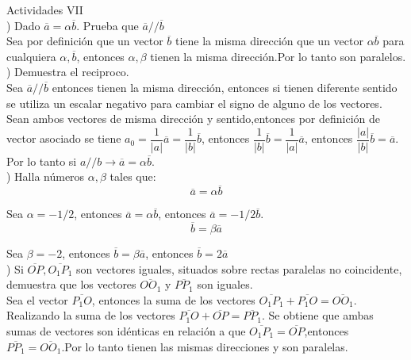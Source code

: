 \documentclass[11pt,a4paper]{article}
\begin{document}
\begin{justify}
\noindent
Actividades VII\\

) Dado $\overline{a} = \alpha \overline{b}$. Prueba que $\overline{a} // \overline{b}$\\

\noindent
Sea por definición que un vector $\overline{b}$ tiene la misma dirección que un vector $\alpha \overline{b}$ para cualquiera $\alpha ,\overline{b}$, entonces $\alpha, \beta$ tienen la misma dirección.Por lo tanto son paralelos.\\

) Demuestra el reciproco.\\

\noindent
Sea $\overline{a} // \overline{b}$ entonces tienen la misma dirección, entonces si tienen diferente sentido se utiliza un escalar negativo para cambiar el signo de alguno de los vectores.\\

\noindent
Sean ambos vectores de misma dirección y sentido,entonces por definición de vector asociado se tiene $a_0=\dfrac{1}{|a|}\overline{a} = \dfrac{1}{|b|}\overline{b}$, entonces $\dfrac{1}{|b|}\overline{b} = \dfrac{1}{|a|}\overline{a}$, entonces  $\dfrac{|a|}{|b|}\overline{b} = \overline{a}$. Por lo tanto si $a // b \rightarrow \overline{a} = \alpha \overline{b}$.\\

) Halla números $\alpha, \beta $ tales que:\\

$$ \overline{a} = \alpha \overline{b} $$

\noindent
Sea $\alpha = -1/2$, entonces $\overline{a} = \alpha \overline{b}$, entonces $\overline{a} = -1/2 \overline{b}$.\\

$$ \overline{b} = \beta \overline{a} $$

Sea $\beta = -2$, entonces $\overline{b} = \beta \overline{a}$, entonces $ \overline{b} = 2 \overline{a} $\\

) Si $\overline{OP}, \overline{O_1P_1}$ son vectores iguales, situados sobre rectas paralelas no coincidente, demuestra que los vectores $\overline{OO_1}$ y $\overline{PP_1}$ son iguales.\\

\noindent
Sea el vector $\overline{P_1 O}$, entonces la suma de los vectores $\overline{O_1P_1}+\overline{P_1 O} = \overline{OO_1}$. Realizando la suma de los vectores $\overline{P_1 O}+\overline{OP} = \overline{PP_1}$. Se obtiene que ambas sumas de vectores son idénticas en relación a que $\overline{O_1P_1} = \overline{OP}$,entonces $\overline{PP_1} = \overline{OO_1}$.Por lo tanto tienen las mismas direcciones y son paralelas.\\


\end{justify}
\end{document}
